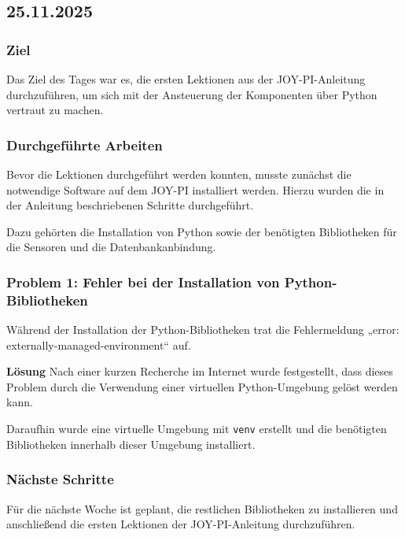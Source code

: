 \subsection{25.11.2025}

\subsubsection{Ziel}
Das Ziel des Tages war es, die ersten Lektionen aus der JOY-PI-Anleitung
durchzuführen, um sich mit der Ansteuerung der Komponenten über Python
vertraut zu machen.

\subsubsection{Durchgeführte Arbeiten}
Bevor die Lektionen durchgeführt werden konnten, musste zunächst die
notwendige Software auf dem JOY-PI installiert werden. Hierzu wurden die
in der Anleitung beschriebenen Schritte durchgeführt.

Dazu gehörten die Installation von Python sowie der benötigten
Bibliotheken für die Sensoren und die Datenbankanbindung.

\subsubsection{Problem 1: Fehler bei der Installation von Python-Bibliotheken}
Während der Installation der Python-Bibliotheken trat die Fehlermeldung
„error: externally-managed-environment“ auf.

\textbf{Lösung}
Nach einer kurzen Recherche im Internet wurde festgestellt, dass dieses
Problem durch die Verwendung einer virtuellen Python-Umgebung gelöst
werden kann.

Daraufhin wurde eine virtuelle Umgebung mit \texttt{venv} erstellt und
die benötigten Bibliotheken innerhalb dieser Umgebung installiert.

\subsubsection{Nächste Schritte}
Für die nächste Woche ist geplant, die restlichen Bibliotheken zu
installieren und anschließend die ersten Lektionen der JOY-PI-Anleitung
durchzuführen.